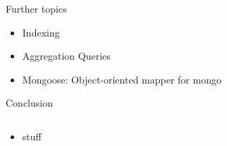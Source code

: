 \begin{frame}{Further topics}
    \begin{itemize}

      \item Indexing
      \item Aggregation Queries
      \item Mongoose: Object-oriented mapper for mongo
    \end{itemize}
\end{frame}

\begin{frame}{Conclusion}
  \begin{columns}[onlytextwidth]
    \begin{column}{0.6\textwidth}
      \begin{itemize}
          \item stuff
      \end{itemize}
    \end{column}
    \begin{column}[t]{0.4\textwidth}
    \end{column}
  \end{columns}
\end{frame}
